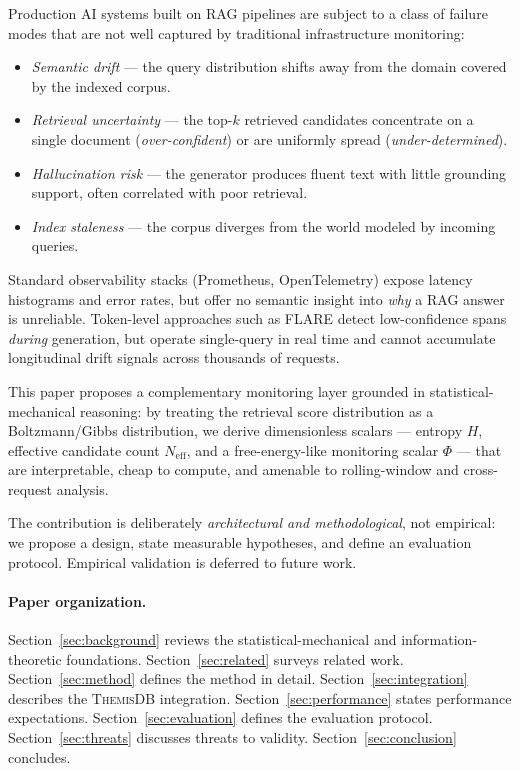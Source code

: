 \documentclass[11pt,a4paper]{article}
\newcommand{\themisdb}{\textsc{ThemisDB}}
\theoremstyle{definition}
\begin{document}
Production AI systems built on RAG pipelines are subject to a class of
failure modes that are not well captured by traditional infrastructure
monitoring:
\begin{itemize}[noitemsep]
  \item \emph{Semantic drift} --- the query distribution shifts away from
    the domain covered by the indexed corpus.
  \item \emph{Retrieval uncertainty} --- the top-$k$ retrieved candidates
    concentrate on a single document (\emph{over-confident}) or are
    uniformly spread (\emph{under-determined}).
  \item \emph{Hallucination risk} --- the generator produces fluent text
    with little grounding support, often correlated with poor retrieval.
  \item \emph{Index staleness} --- the corpus diverges from the world
    modeled by incoming queries.
\end{itemize}

Standard observability stacks (Prometheus, OpenTelemetry) expose latency
histograms and error rates, but offer no semantic insight into \emph{why}
a RAG answer is unreliable.
Token-level approaches such as FLARE \citep{jiang2023flare} detect
low-confidence spans \emph{during} generation, but operate
single-query in real time and cannot accumulate longitudinal drift
signals across thousands of requests.

This paper proposes a complementary monitoring layer grounded in
statistical-mechanical reasoning:
by treating the retrieval score distribution as a Boltzmann/Gibbs
distribution, we derive dimensionless scalars --- entropy $H$, effective
candidate count $N_\text{eff}$, and a free-energy-like monitoring scalar
$\Phi$ --- that are interpretable, cheap to compute, and
amenable to rolling-window and cross-request analysis.

The contribution is deliberately \emph{architectural and methodological},
not empirical: we propose a design, state measurable hypotheses, and
define an evaluation protocol.
Empirical validation is deferred to future work.

\paragraph{Paper organization.}
Section~\ref{sec:background} reviews the statistical-mechanical and
information-theoretic foundations.
Section~\ref{sec:related} surveys related work.
Section~\ref{sec:method} defines the method in detail.
Section~\ref{sec:integration} describes the \themisdb{} integration.
Section~\ref{sec:performance} states performance expectations.
Section~\ref{sec:evaluation} defines the evaluation protocol.
Section~\ref{sec:threats} discusses threats to validity.
Section~\ref{sec:conclusion} concludes.
\end{document}
